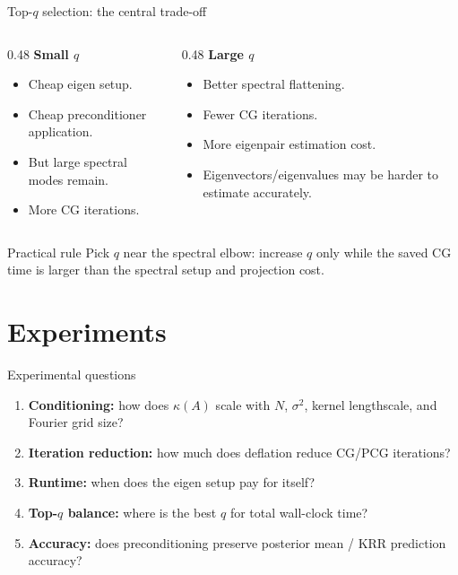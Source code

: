 \documentclass[aspectratio=169,10pt]{beamer}
\begin{document}
\begin{frame}{Top-$q$ selection: the central trade-off}
\begin{columns}[T,totalwidth=\textwidth]
\begin{column}{0.48\textwidth}
\textbf{Small $q$}
\begin{itemize}
  \item Cheap eigen setup.
  \item Cheap preconditioner application.
  \item But large spectral modes remain.
  \item More CG iterations.
\end{itemize}
\end{column}
\begin{column}{0.48\textwidth}
\textbf{Large $q$}
\begin{itemize}
  \item Better spectral flattening.
  \item Fewer CG iterations.
  \item More eigenpair estimation cost.
  \item Eigenvectors/eigenvalues may be harder to estimate accurately.
\end{itemize}
\end{column}
\end{columns}

\vspace{0.8em}
\begin{alertblock}{Practical rule}
Pick $q$ near the spectral elbow: increase $q$ only while the saved CG time is larger than the spectral setup and projection cost.
\end{alertblock}
\end{frame}

\section{Experiments}

\begin{frame}{Experimental questions}
\begin{enumerate}
  \item \textbf{Conditioning:} how does $\kappa(A)$ scale with $N$, $\sigma^2$, kernel lengthscale, and Fourier grid size?
  \item \textbf{Iteration reduction:} how much does deflation reduce CG/PCG iterations?
  \item \textbf{Runtime:} when does the eigen setup pay for itself?
  \item \textbf{Top-$q$ balance:} where is the best $q$ for total wall-clock time?
  \item \textbf{Accuracy:} does preconditioning preserve posterior mean / KRR prediction accuracy?
\end{enumerate}
\end{frame}
\end{document}
